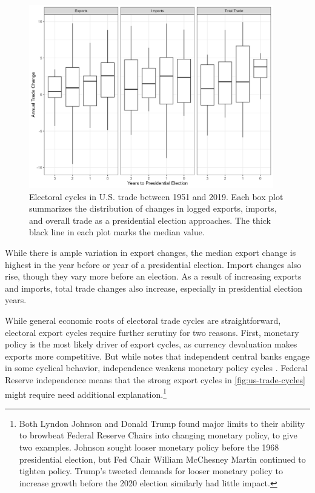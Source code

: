 \documentclass[12pt]{article}
\begin{document}
\begin{figure}
\centering
\includegraphics[width=0.95\textwidth]{../figures/us-trade-cycles.png}
\caption{Electoral cycles in U.S. trade between 1951 and 2019. Each box plot summarizes the distribution of changes in logged exports, imports, and overall trade as a presidential election approaches. The thick black line in each plot marks the median value.}
\label{fig:us-trade-cycles}
\end{figure}


While there is ample variation in export changes, the median export change is highest in the year before or year of a presidential election.
Import changes also rise, though they vary more before an election. 
As a result of increasing exports and imports, total trade changes also increase, especially in presidential election years.


While general economic roots of electoral trade cycles are straightforward, electoral export cycles require further scrutiny for two reasons.
First, monetary policy is the most likely driver of export cycles, as currency devaluation makes exports more competitive. 
But while \citet[pg. 247]{Dubois2016} notes that independent central banks engage in some cyclical behavior, independence weakens monetary policy cycles \citep{ClarkHallerberg2000}. 
Federal Reserve independence means that the strong export cycles in \autoref{fig:us-trade-cycles} might require need additional explanation.\footnote{Both Lyndon Johnson and Donald Trump found major limits to their ability to browbeat Federal Reserve Chairs into changing monetary policy, to give two examples. 
Johnson sought looser monetary policy before the 1968 presidential election, but Fed Chair William McChesney Martin continued to tighten policy.
Trump's tweeted demands for looser monetary policy to increase growth before the 2020 election similarly had little impact.}
\end{document}
